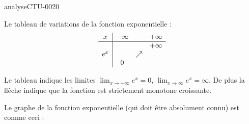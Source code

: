 
\begin{corrige}{analyseCTU-0020}

    Le tableau de variations de la fonction exponentielle :
    \begin{equation*}
        \begin{array}[]{c|ccc}
             x&-\infty&&+\infty\\
              \hline
              &&&+\infty\\ 
              e^x&&\nearrow&\\ 
              &0&&\\ 
               \end{array}
        \end{equation*}
        
        Le tableau indique les limites \( \lim_{x\to -\infty} e^x=0\), \( \lim_{x\to \infty} e^x=\infty\). De plus la flèche indique que la fonction est strictement monotone croissante.

        Le graphe de la fonction exponentielle (qui doit être absolument connu) est comme ceci :

\begin{center}
   
\end{center}

\end{corrige}
